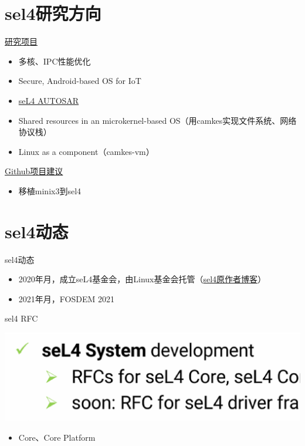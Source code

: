 \documentclass[presentation,dvipdfmx,CJKbookmarks]{beamer}
\begin{document}
\begin{CJK*}{UTF8}{simsun}
\section{sel4\thinspace 研究方向}
\label{sec:org64b04d4}
\begin{frame}[label={sec:orgd7cde23}]{\href{https://ts.data61.csiro.au/students/theses.pml.html}{研究项目}}
\begin{itemize}
\item 多核、IPC\thinspace 性能优化
\item Secure, Android-based OS for IoT
\item \href{https://ts.data61.csiro.au/projects/TS/realtime.pml.html}{seL4 AUTOSAR}
\item Shared resources in an microkernel-based OS（用\thinspace camkes\thinspace 实现文件系统、网络协议栈）
\item Linux as a component（camkes-vm）
\end{itemize}
\end{frame}
\begin{frame}[label={sec:orge470937}]{\href{https://github.com/seL4/docs/blob/master/SuggestedProjects.md}{Github\thinspace 项目建议}}
\begin{itemize}
\item 移植\thinspace minix3\thinspace 到\thinspace sel4
\end{itemize}
\end{frame}


\section{sel4\thinspace 动态}
\label{sec:org9d71d1a}
\begin{frame}[label={sec:org6b324dd}]{sel4\thinspace 动态}
\begin{itemize}
\item 2020\thinspace 年\thinspace 月，成立\thinspace seL4\thinspace 基金会，由\thinspace Linux\thinspace 基金会托管（\href{https://microkerneldude.wordpress.com/2020/04/07/the-sel4-foundation-what-and-why/}{sel4\thinspace 原作者博客}）
\item 2021\thinspace 年\thinspace 月，FOSDEM 2021
\end{itemize}
\end{frame}
\begin{frame}[label={sec:orgba63180}]{sel4 RFC}
\begin{center}
\includegraphics[width=.9\linewidth]{./images/rfc-for-core.ps}
\end{center}
\begin{itemize}
\item Core、Core Platform
\end{itemize}
\end{frame}


\end{CJK*}
\end{document}
